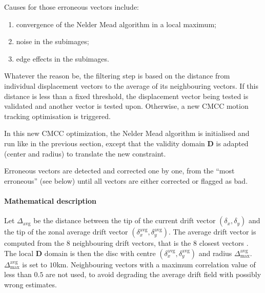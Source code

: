 \documentclass[letterpaper,10pt,english]{jupyterBook}
\begin{document}
\sphinxAtStartPar
Causes for those erroneous vectors include:
\begin{enumerate}
%
\item {} 
\sphinxAtStartPar
convergence of the Nelder Mead algorithm in a local maximum;

\item {} 
\sphinxAtStartPar
noise in the sub\sphinxhyphen{}images;

\item {} 
\sphinxAtStartPar
edge effects in the sub\sphinxhyphen{}images.

\end{enumerate}

\sphinxAtStartPar
Whatever the reason be, the filtering step is based on the
distance from individual displacement vectors to the average of its
neighbouring vectors. If this distance is less than a fixed threshold,
the displacement vector being tested is validated and another vector is
tested upon. Otherwise, a new CMCC motion tracking optimisation is triggered.

\sphinxAtStartPar
In this new CMCC optimization, the Nelder Mead algorithm is initialised and run like in the previous
section, except that the validity domain \(\mathbf{D}\) is adapted (center and radius) to translate the new constraint.

\sphinxAtStartPar
Erroneous vectors are detected and corrected one by one, from the “most erroneous” (see below) until
all vectors are either corrected or flagged as bad.


\paragraph{Mathematical description}
\label{\detokenize{baseline_algorithm_definition:id18}}
\sphinxAtStartPar
Let \(\Delta_{\textrm{avg}}\) be the distance between the tip of the
current drift vector \((\delta_x,\delta_y)\) and the tip of the zonal
average drift vector
\((\delta^{\textrm{avg}}_x,\delta^{\textrm{avg}}_y)\). The average drift
vector is computed from the 8 neighbouring drift vectors, that is the 8
closest vectors . The local \(\mathbf{D}\)
domain is then the disc with centre
\((\delta^{\textrm{avg}}_x,\delta^{\textrm{avg}}_y)\) and radius
\(\Delta^{\textrm{avg}}_{\textrm{max}}\). \(\Delta^{\textrm{avg}}_{\textrm{max}}\) is set to \(10\)km.
Neighbouring vectors with a maximum correlation value of less than \(0.5\) are not
used, to avoid degrading the average drift field with possibly wrong
estimates.
\end{document}
